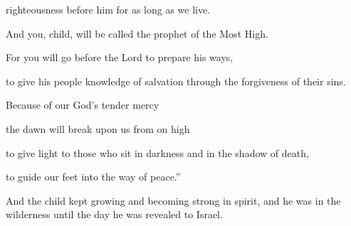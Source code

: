 {righteousness
before
him
for as long as
we
live.
\par }{\Q {}And
you,
child,
will be called
the prophet
of the Most High.
\par }{\Q For
you will go
before
the Lord
to prepare
his
ways,
\par }{\Q {}to give
his
people
knowledge
of salvation
through
the forgiveness
of
their
sins.
\par }{\Q {}Because of
our
God’s
tender
mercy
\par }{\Q the dawn
will break upon
us
from
on high
\par }{\Q {}to give light
to those who sit
in
darkness
and
in the shadow
of death,
\par }{\Q to guide
our
feet
into
the way
of peace.”
\par }{\PP {}And
the child
kept growing
and
becoming strong
in spirit,
and
he was
in
the wilderness
until
the day
he
was revealed
to
Israel.












































}
